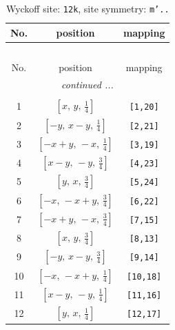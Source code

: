 \documentclass[fleqn,8pt]{jsarticle}
\begin{document}
\begin{longtable}{ccc}
\caption{Wyckoff site: {\tt 12k}, site symmetry: {\tt m'..}}
 \\
 \hline \hline
No. & position & mapping \\ \hline \endfirsthead

\multicolumn{2}{l}{\tablename\ \thetable{}} \\
 \hline \hline
No. & position & mapping \\ \hline \endhead

 \hline \hline
\multicolumn{2}{r}{\footnotesize\it continued ...} \\ \endfoot

 \hline \hline
\multicolumn{2}{r}{} \\ \endlastfoot

1 & $\left[ x,\, y,\, \frac{1}{4} \right]$ & {\tt [1,20]} \\ \hline
2 & $\left[ - y,\, x - y,\, \frac{1}{4} \right]$ & {\tt [2,21]} \\ \hline
3 & $\left[ - x + y,\, - x,\, \frac{1}{4} \right]$ & {\tt [3,19]} \\ \hline
4 & $\left[ x - y,\, - y,\, \frac{3}{4} \right]$ & {\tt [4,23]} \\ \hline
5 & $\left[ y,\, x,\, \frac{3}{4} \right]$ & {\tt [5,24]} \\ \hline
6 & $\left[ - x,\, - x + y,\, \frac{3}{4} \right]$ & {\tt [6,22]} \\ \hline
7 & $\left[ - x + y,\, - x,\, \frac{3}{4} \right]$ & {\tt [7,15]} \\ \hline
8 & $\left[ x,\, y,\, \frac{3}{4} \right]$ & {\tt [8,13]} \\ \hline
9 & $\left[ - y,\, x - y,\, \frac{3}{4} \right]$ & {\tt [9,14]} \\ \hline
10 & $\left[ - x,\, - x + y,\, \frac{1}{4} \right]$ & {\tt [10,18]} \\ \hline
11 & $\left[ x - y,\, - y,\, \frac{1}{4} \right]$ & {\tt [11,16]} \\ \hline
12 & $\left[ y,\, x,\, \frac{1}{4} \right]$ & {\tt [12,17]} \\
\end{longtable}
\renewcommand{\arraystretch}{1.2}
\end{document}
